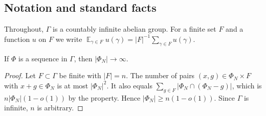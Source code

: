 \subsection{Notation and standard facts}\label{K:ssec:prelim}

Throughout, $\Gamma$ is a countably infinite abelian group.
For a finite set $F$ and a function $u$ on $F$ we write
$\mathop{\mathbb E}_{\gamma\in F}u(\gamma)=|F|^{-1}\sum_{\gamma\in F}u(\gamma)$.

\begin{lemma}\label{K:lem:folner-grow}
If $\Phi$ is a \Fol{} sequence in $\Gamma$, then $|\Phi_N|\to\infty$.
\end{lemma}

\begin{proof}
Let $F\subset\Gamma$ be finite with $|F|=n$. The number of pairs $(x,g)\in\Phi_N\times F$
with $x+g\in\Phi_N$ is at most $|\Phi_N|^2$. It also equals
$\sum_{g\in F}|\Phi_N\cap(\Phi_N-g)|$, which is $n|\Phi_N|(1-o(1))$ by the \Fol{}
property. Hence $|\Phi_N|\ge n(1-o(1))$. Since $\Gamma$ is infinite, $n$ is arbitrary.
\end{proof}

